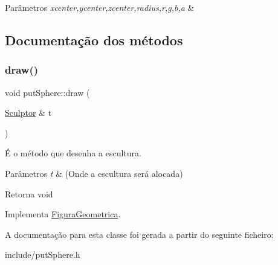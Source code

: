 \begin{DoxyParams}{Parâmetros}
{\em xcenter,ycenter,zcenter,radius,r,g,b,a} & \\
\hline
\end{DoxyParams}


\subsection{Documentação dos métodos}
\mbox{\label{classput_sphere_addd9a9936084a1f83bd22973c6e3da16}} 
\subsubsection{\texorpdfstring{draw()}{draw()}}
{\footnotesize\ttfamily void put\+Sphere\+::draw (\begin{DoxyParamCaption}\item[{\hyperlink{class_sculptor}{Sculptor} \&}]{t }\end{DoxyParamCaption})\hspace{0.3cm}{\ttfamily [virtual]}}



É o método que desenha a escultura. 


\begin{DoxyParams}{Parâmetros}
{\em t} & (Onde a escultura será alocada) \\
\hline
\end{DoxyParams}
\begin{DoxyReturn}{Retorna}
void 
\end{DoxyReturn}


Implementa \hyperlink{class_figura_geometrica_a34585fd7c0bd7378fc69c4ee208e676c}{Figura\+Geometrica}.



A documentação para esta classe foi gerada a partir do seguinte ficheiro\+:\begin{DoxyCompactItemize}
\item 
include/put\+Sphere.\+h\end{DoxyCompactItemize}
